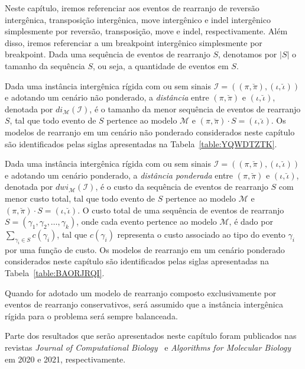 Neste capítulo, iremos referenciar aos eventos de rearranjo de reversão intergênica, transposição intergênica, move intergênico e indel intergênico simplesmente por reversão, transposição, move e indel, respectivamente. Além disso, iremos referenciar a um breakpoint intergênico simplesmente por breakpoint. Dada uma sequência de eventos de rearranjo $S$, denotamos por $|S|$ o tamanho da sequência $S$, ou seja, a quantidade de eventos em $S$.

Dada uma instância intergênica rígida com ou sem sinais $\mathcal{I}=((\pi,\breve\pi),(\iota,\breve\iota))$ e adotando um cenário não ponderado, a \emph{distância} entre $(\pi,\breve\pi)$ e $(\iota,\breve\iota)$, denotada por $di_{\mathcal{M}}(\mathcal{I})$, é o tamanho da menor sequência de eventos de rearranjo $S$, tal que todo evento de $S$ pertence ao modelo $\mathcal{M}$ e $(\pi,\breve\pi) \cdot S = (\iota,\breve\iota)$. Os modelos de rearranjo em um cenário não ponderado considerados neste capítulo são identificados pelas siglas apresentadas na Tabela~\ref{table:YQWDTZTK}.



Dada uma instância intergênica rígida com ou sem sinais $\mathcal{I}=((\pi,\breve\pi),(\iota,\breve\iota))$ e adotando um cenário ponderado, a \emph{distância ponderada} entre $(\pi,\breve\pi)$ e $(\iota,\breve\iota)$, denotada por $dwi_{\mathcal{M}}(\mathcal{I})$, é o custo da sequência de eventos de rearranjo $S$ com menor custo total, tal que todo evento de $S$ pertence ao modelo $\mathcal{M}$ e $(\pi,\breve\pi) \cdot S = (\iota,\breve\iota)$. O custo total de uma sequência de eventos de rearranjo $S=(\gamma_1, \gamma_2, \dots, \gamma_k)$, onde cada evento pertence ao modelo $\mathcal{M}$, é dado por $\sum_{\gamma_i \in S} c(\gamma_i)$, tal que $c(\gamma_i)$ representa o custo associado ao tipo do evento $\gamma_i$ por uma função de custo. Os modelos de rearranjo em um cenário ponderado considerados neste capítulo são identificados pelas siglas apresentadas na Tabela~\ref{table:BAORJRQI}.



Quando for adotado um modelo de rearranjo composto exclusivamente por eventos de rearranjo conservativos, será assumido que a instância intergênica rígida para o problema será sempre balanceada.

Parte dos resultados que serão apresentados neste capítulo foram publicados nas revistas \emph{Journal of Computational Biology}~\cite{2020a-brito-etal} e \emph{Algorithms for Molecular Biology}~\cite{2021b-brito-etal} em 2020 e 2021, respectivamente.

